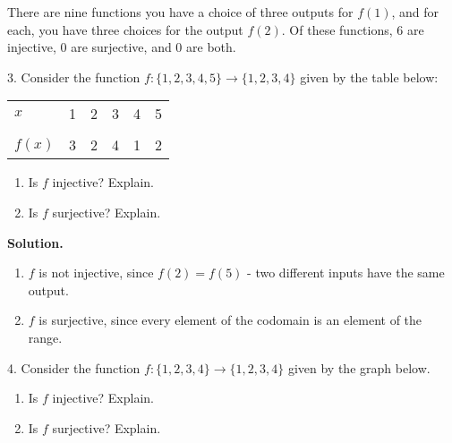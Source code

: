 \documentclass[10pt,]{book}
\theoremstyle{plain}
\theoremstyle{definition}
\theoremstyle{definition}
\theoremstyle{definition}
\numberwithin{equation}{section}
\newcommand{\hrulethin}  {\noalign{\hrule height 0.04em}}
\begin{document}
\begin{exerciselist}
There are nine functions \textendash{} you have a choice of three outputs for \(f(1)\), and for each, you have three choices for the output \(f(2)\). Of these functions, 6 are injective, 0 are surjective, and 0 are both.
%
\item[3.]\hypertarget{exercise-29}{}
Consider the function \(f:\{1,2,3,4,5\} \to \{1,2,3,4\}\) given by the table below:
%
\begin{tabular}{llllll}
\(x\)&1&2&3&4&5\tabularnewline[0pt]
&&&&&\tabularnewline\hrulethin
\(f(x)\)&3&2&4&1&2
\end{tabular}
\leavevmode%
\begin{enumerate}[label=(\alph*)]
\item\hypertarget{li-299}{}
Is \(f\) injective?  Explain.
%
\item\hypertarget{li-300}{}
Is \(f\) surjective?  Explain.
%
\end{enumerate}
\par\smallskip
\par\smallskip
\noindent\textbf{Solution.}\hypertarget{solution-47}{}\quad
\leavevmode%
\begin{enumerate}[label=(\alph*)]
\item\hypertarget{li-301}{}\(f\) is not injective, since \(f(2) = f(5)\) - two different inputs have the same output.\item\hypertarget{li-302}{}\(f\) is surjective, since every element of the codomain is an element of the range.\end{enumerate}
\item[4.]\hypertarget{exercise-30}{}
Consider the function \(f:\{1,2,3,4\} \to \{1,2,3,4\}\) given by the graph below.
%
{
}
\leavevmode%
\begin{enumerate}[label=(\alph*)]
\item\hypertarget{li-303}{}
Is \(f\) injective?  Explain.
%
\item\hypertarget{li-304}{}
Is \(f\) surjective?  Explain.
%
\end{enumerate}
\par\smallskip
\par\smallskip

\end{exerciselist}
\end{document}
